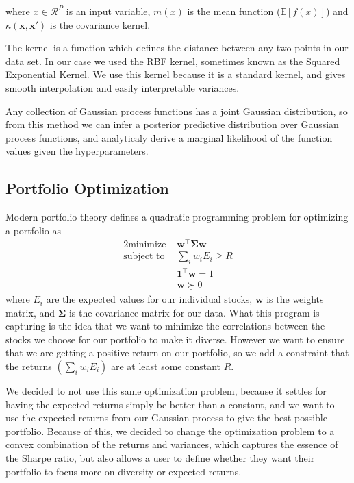 \documentclass{article}
\begin{document}
where $x \in \mathcal{R}^P$ is an input variable, $m(x)$ is the mean function ($\mathbb{E}[f(x)]$) and $\kappa (\textbf{x}, \textbf{x}')$ is the covariance kernel.  

The kernel is a function which defines the distance between any two points in our data set. In our case we used the RBF kernel, sometimes known as the Squared Exponential Kernel. We use this kernel because it is a standard kernel, and gives smooth interpolation and easily interpretable variances. 

Any collection of Gaussian process functions has a joint Gaussian distribution, so from this method we can infer a posterior predictive distribution over Gaussian process functions, and analyticaly derive a marginal likelihood of the function values given the hyperparameters. \cite{spectral}


\subsection{Portfolio Optimization}

Modern portfolio theory defines a quadratic programming problem for optimizing a portfolio as
\begin{alignat*}{2}
    \text{minimize }   &   \textbf{w}^\top \mathbf{\Sigma} \textbf{w}\\
    \text{subject to } & \sum_i w_i E_i \geq R \\
    & \textbf{1}^\top \textbf{w} = 1 \\
    & \textbf{w} \underline{\succ} 0
\end{alignat*}
where $E_i$ are the expected values for our individual stocks, $\textbf{w}$ is the weights matrix, and $\mathbf{\Sigma}$ is the covariance matrix for our data. What this program is capturing is the idea that we want to minimize the correlations between the stocks we choose for our portfolio to make it diverse.  However we want to ensure that we are getting a positive return on our portfolio, so we add a constraint that the returns $\left(\sum_i w_i E_i \right)$ are at least some constant $R$.  

We decided to not use this same optimization problem, because it settles for having the expected returns simply be better than a constant, and we want to use the expected returns from our Gaussian process to give the best possible portfolio.  Because of this, we decided to change the optimization problem to a convex combination of the returns and variances, which captures the essence of the Sharpe ratio, but also allows a user to define whether they want their portfolio to focus more on diversity or expected returns.  
\end{document}

